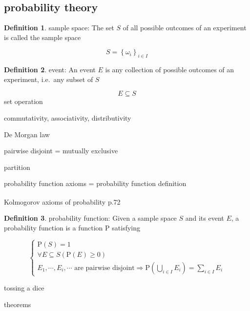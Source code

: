 \documentclass[
]{book}
\theoremstyle{definition}
\newtheorem{definition}{Definition}[chapter]
\theoremstyle{definition}
\theoremstyle{definition}
\theoremstyle{definition}
\theoremstyle{remark}
\begin{document}
\subsection{probability theory}\label{probability-theory}

\begin{definition}
\protect\hypertarget{def:unnamed-chunk-2}{}\label{def:unnamed-chunk-2}sample space: The set \(S\) of all possible outcomes of an experiment is called the sample space
\end{definition}

\[
S=\left\{ \omega_{{\scriptscriptstyle i}}\right\} _{{\scriptscriptstyle i}\in I}
\]

\begin{definition}
\protect\hypertarget{def:unnamed-chunk-3}{}\label{def:unnamed-chunk-3}event: An event \(E\) is any collection of possible outcomes of an experiment, i.e.~any subset of \(S\)
\end{definition}

\[
E \subseteq S
\]
set operation

commutativity, associativity, distributivity

De Morgan law

pairwise disjoint = mutually exclusive

partition

probability function axioms = probability function definition

Kolmogorov axioms of probability\textsuperscript{} p.72

\begin{definition}
\protect\hypertarget{def:unnamed-chunk-4}{}\label{def:unnamed-chunk-4}probability function: Given a sample space \(S\) and its event \(E\), a probability function is a function \(\mathrm{P}\) satisfying
\end{definition}

\[
\begin{cases}
\mathrm{P}\left(S\right)=1\\
\forall E\subseteq S\left(\mathrm{P}\left(E\right)\ge0\right)\\
E_{{\scriptscriptstyle 1}},\cdots,E_{{\scriptscriptstyle i}},\cdots\text{ are pairwise disjoint}\Rightarrow\mathrm{P}\left(\bigcup\limits _{i\in I}E_{{\scriptscriptstyle i}}\right)=\sum\limits _{i\in I}E_{{\scriptscriptstyle i}}
\end{cases}
\]

tossing a dice

theorems
\end{document}
